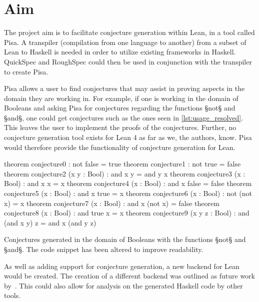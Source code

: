 \section{Aim}\label{sec:introduction:problem-statement}
The project aim is to facilitate conjecture generation within Lean, in a tool called Pisa.
A transpiler (compilation from one language to another) from a subset of Lean to Haskell is needed in order to utilize existing frameworks in Haskell.
QuickSpec and RoughSpec could then be used in conjunction with the transpiler to create Pisa.

Pisa allows a user to find conjectures that may assist in proving aspects in the domain they are working in.
For example, if one is working in the domain of Booleans and asking Pisa for conjectures regarding the functions §not§ and §and§, one could get conjectures such as the ones seen in \cref{lst:usage_resolved}.
This leaves the user to implement the proofs of the conjectures.
Further, no conjecture generation tool exists for Lean 4 as far as we, the authors, know.
Pisa would therefore provide the functionality of conjecture generation for Lean.

\begin{listing}[H]
\begin{LeanCode}
  theorem conjecture0                :       not false = true
  theorem conjecture1                :        not true = false
  theorem conjecture2 (x y : Bool)   :         and x y = and y x
  theorem conjecture3 (x : Bool)     :         and x x = x
  theorem conjecture4 (x : Bool)     :     and x false = false
  theorem conjecture5 (x : Bool)     :      and x true = x
  theorem conjecture6 (x : Bool)     :     not (not x) = x
  theorem conjecture7 (x : Bool)     :   and x (not x) = false
  theorem conjecture8 (x : Bool)     :      and true x = x
  theorem conjecture9 (x y z : Bool) : and (and x y) z = and x (and y z)
\end{LeanCode}
\caption[Conjectures generated in the domain of Booleans with §not§ and §and§.]{
  Conjectures generated in the domain of Booleans with the functions §not§ and §and§.
  The code snippet has been altered to improve readability.
}
\label{lst:usage_resolved}
\end{listing}

As well as adding support for conjecture generation, a new backend for Lean would be created.
The creation of a different backend was outlined as future work by~\cite{Lean4}.
This could also allow for analysis on the generated Haskell code by other tools.

